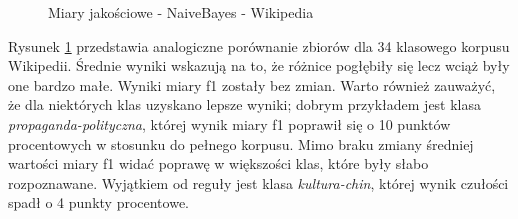 \begin{figure}[ht!]
	\centering
    \qquad
	\caption{Miary jakościowe - NaiveBayes - Wikipedia}
    \label{fig:report-naivebayes-wikipedia}
\end{figure}

Rysunek \ref{fig:report-naivebayes-wikipedia} przedstawia analogiczne porównanie zbiorów dla 34 klasowego korpusu Wikipedii. Średnie wyniki wskazują na to, że różnice pogłębiły się lecz wciąż były one bardzo małe. Wyniki miary f1 zostały bez zmian. Warto również zauważyć, że dla niektórych klas uzyskano lepsze wyniki; dobrym przykładem jest klasa \textit{propaganda-polityczna}, której wynik miary f1 poprawił się o 10 punktów procentowych w stosunku do pełnego korpusu. Mimo braku zmiany średniej wartości miary f1 widać poprawę w większości klas, które były słabo rozpoznawane. Wyjątkiem od reguły jest klasa \textit{kultura-chin}, której wynik czułości spadł o 4 punkty procentowe.

